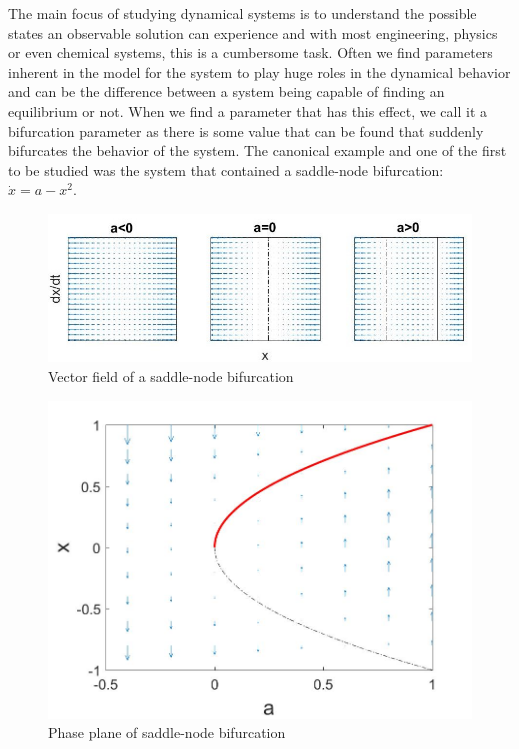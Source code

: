 The main focus of studying dynamical systems is to understand the possible states an observable solution can experience and with most engineering, physics or even chemical systems, this is a cumbersome task. Often we find parameters inherent in the model for the system to play huge roles in the dynamical behavior and can be the difference between a system being capable of finding an equilibrium or not. When we find a parameter that has this effect, we call it a bifurcation parameter as there is some value that can be found that suddenly bifurcates the behavior of the system. The canonical example and one of the first to be studied was the system that contained a saddle-node bifurcation: $\dot{x}=a-x^2$.

\begin{figure}[H]
\centering
\includegraphics[width=\linewidth]{intro/saddlenode.jpg}
\caption{Vector field of a saddle-node bifurcation}
\label{fig:intro_saddlenode}
\end{figure}


\begin{figure}[H]
\centering
\includegraphics[width=\linewidth]{intro/saddlenode_bif_diagram.jpg}
\caption{Phase plane of saddle-node bifurcation}
\label{fig:intro_saddlenode_bif_diagram}
\end{figure}



